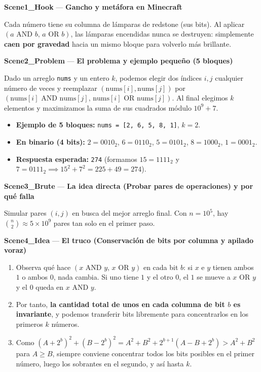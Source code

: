 \documentclass[letterpaper,10pt]{article}
\newcommand{\scene}[2]{\noindent\textbf{\textcolor{mcaqua}{#1}} --- \textbf{#2}\par\vspace{1pt}}
\begin{document}
\begin{shaded}
\scene{Scene1\_Hook}{Gancho y met\'afora en Minecraft}
Cada n\'umero tiene su columna de l\'amparas de redstone (sus bits). Al aplicar $(a \text{ AND } b,\, a \text{ OR } b)$, las l\'amparas encendidas nunca se destruyen: simplemente \textbf{caen por gravedad} hacia un mismo bloque para volverlo m\'as brillante.

\scene{Scene2\_Problem}{El problema y ejemplo peque\~no (5 bloques)}
Dado un arreglo \texttt{nums} y un entero $k$, podemos elegir dos \'indices $i, j$ cualquier n\'umero de veces y reemplazar $(\text{nums}[i], \text{nums}[j])$ por $(\text{nums}[i] \text{ AND } \text{nums}[j],\, \text{nums}[i] \text{ OR } \text{nums}[j])$. Al final elegimos $k$ elementos y maximizamos la suma de sus cuadrados m\'odulo $10^9 + 7$.
\begin{itemize}\setlength{\itemsep}{1pt}
  \item \textbf{Ejemplo de 5 bloques:} \texttt{nums = [2, 6, 5, 8, 1]}, $k = 2$.
  \item \textbf{En binario (4 bits):} $2=0010_2$, $6=0110_2$, $5=0101_2$, $8=1000_2$, $1=0001_2$.
  \item \textbf{Respuesta esperada:} \texttt{274} (formamos $15 = 1111_2$ y $7 = 0111_2 \implies 15^2 + 7^2 = 225 + 49 = 274$).
\end{itemize}

\scene{Scene3\_Brute}{La idea directa (Probar pares de operaciones) y por qu\'e falla}
Simular pares $(i, j)$ en busca del mejor arreglo final. Con $n = 10^5$, hay $\binom{n}{2} \approx 5 \times 10^9$ pares tan solo en el primer paso.

\scene{Scene4\_Idea}{El truco (Conservaci\'on de bits por columna y apilado voraz)}
\begin{enumerate}\setlength{\itemsep}{1pt}
  \item Observa qu\'e hace $(x \text{ AND } y,\, x \text{ OR } y)$ en cada bit $b$: si $x$ e $y$ tienen ambos $1$ o ambos $0$, nada cambia. Si uno tiene $1$ y el otro $0$, el $1$ se mueve a $x \text{ OR } y$ y el $0$ queda en $x \text{ AND } y$.
  \item Por tanto, \textbf{la cantidad total de unos en cada columna de bit $b$ es invariante}, y podemos transferir bits libremente para concentrarlos en los primeros $k$ n\'umeros.
  \item Como $(A + 2^b)^2 + (B - 2^b)^2 = A^2 + B^2 + 2^{b+1}(A - B + 2^b) > A^2 + B^2$ para $A \ge B$, siempre conviene concentrar todos los bits posibles en el primer n\'umero, luego los sobrantes en el segundo, y as\'i hasta $k$.
\end{enumerate}


\end{shaded}
\end{document}
